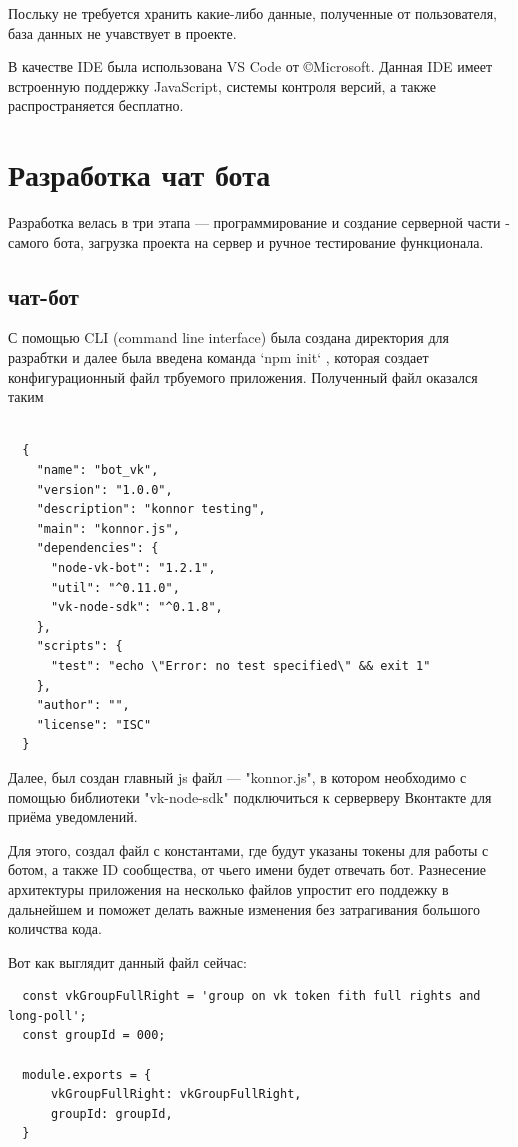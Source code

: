 \documentclass[bachelor, och, coursework, times]{SCWorks}
\begin{document}
Посльку не требуется хранить какие-либо данные, полученные от пользователя, база данных не учавствует в проекте.

В качестве IDE была использована VS Code от \copyright Microsoft.
Данная IDE имеет встроенную поддержку JavaScript, системы контроля версий, а также распространяется бесплатно.
\section {Разработка чат бота}
Разработка велась в три этапа --- программирование и создание серверной части - самого бота,
загрузка проекта на сервер и ручное тестирование функционала.
\subsection {чат-бот}
С помощью CLI (command line interface)
была создана директория для разрабтки и далее была введена команда `npm init` ,
которая создает конфигурационный файл трбуемого приложения. Полученный файл оказался таким

\begin{lstlisting}
    
  {
    "name": "bot_vk",
    "version": "1.0.0",
    "description": "konnor testing",
    "main": "konnor.js",
    "dependencies": {
      "node-vk-bot": "1.2.1",
      "util": "^0.11.0",
      "vk-node-sdk": "^0.1.8",
    },
    "scripts": {
      "test": "echo \"Error: no test specified\" && exit 1"
    },
    "author": "",
    "license": "ISC"
  }
\end{lstlisting}

Далее, был создан главный js файл --- "konnor.js",
в котором необходимо с помощью библиотеки "vk-node-sdk" подключиться к серверверу Вконтакте для приёма уведомлений.

Для этого, создал файл с константами, где будут указаны токены для работы с ботом, а также
ID сообщества, от чьего имени будет отвечать бот. Разнесение архитектуры приложения на несколько файлов
упростит его поддежку в дальнейшем и поможет делать важные изменения без затрагивания большого количства
кода.

Вот как выглядит данный файл сейчас:

\begin{lstlisting}
  const vkGroupFullRight = 'group on vk token fith full rights and long-poll';
  const groupId = 000;

  module.exports = {
      vkGroupFullRight: vkGroupFullRight,
      groupId: groupId,
  }
\end{lstlisting}
\end{document}
